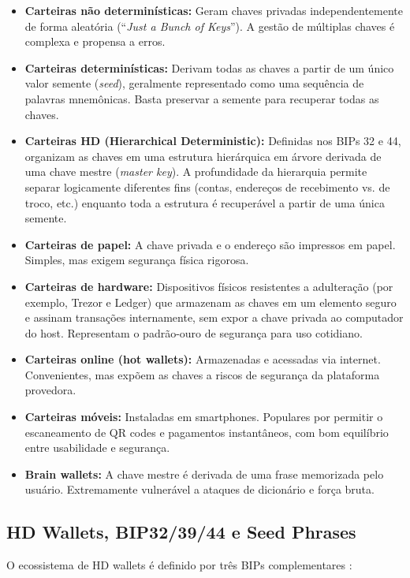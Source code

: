\documentclass[12pt,a4paper]{report}
\begin{document}
\begin{itemize}
    \item \textbf{Carteiras não determinísticas:} Geram chaves privadas independentemente de forma aleatória (``\textit{Just a Bunch of Keys}''). A gestão de múltiplas chaves é complexa e propensa a erros.
    \item \textbf{Carteiras determinísticas:} Derivam todas as chaves a partir de um único valor semente (\textit{seed}), geralmente representado como uma sequência de palavras mnemônicas. Basta preservar a semente para recuperar todas as chaves.
    \item \textbf{Carteiras HD (Hierarchical Deterministic):} Definidas nos BIPs 32 e 44, organizam as chaves em uma estrutura hierárquica em árvore derivada de uma chave mestre (\textit{master key}). A profundidade da hierarquia permite separar logicamente diferentes fins (contas, endereços de recebimento vs. de troco, etc.) enquanto toda a estrutura é recuperável a partir de uma única semente.
    \item \textbf{Carteiras de papel:} A chave privada e o endereço são impressos em papel. Simples, mas exigem segurança física rigorosa.
    \item \textbf{Carteiras de hardware:} Dispositivos físicos resistentes a adulteração (por exemplo, Trezor e Ledger) que armazenam as chaves em um elemento seguro e assinam transações internamente, sem expor a chave privada ao computador do host. Representam o padrão-ouro de segurança para uso cotidiano.
    \item \textbf{Carteiras online (hot wallets):} Armazenadas e acessadas via internet. Convenientes, mas expõem as chaves a riscos de segurança da plataforma provedora.
    \item \textbf{Carteiras móveis:} Instaladas em smartphones. Populares por permitir o escaneamento de QR codes e pagamentos instantâneos, com bom equilíbrio entre usabilidade e segurança.
    \item \textbf{Brain wallets:} A chave mestre é derivada de uma frase memorizada pelo usuário. Extremamente vulnerável a ataques de dicionário e força bruta.
\end{itemize}

\subsection{HD Wallets, BIP32/39/44 e Seed Phrases}

O ecossistema de HD wallets é definido por três BIPs complementares \cite{Bashir2023}:
\end{document}
